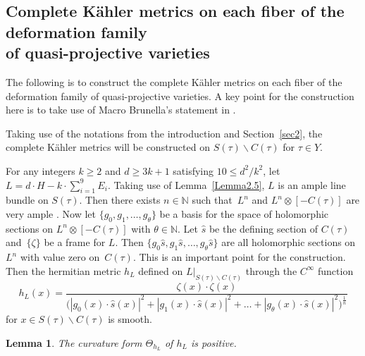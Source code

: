 \documentclass[10pt,a4paper]{amsart}
\numberwithin{equation}{section}
\newtheorem{Lemma}[Theorem]{Lemma}
\def\overline#1{#1}
\begin{document}
\subsection[Complete K\"ahler metrics on each fiber of the deformation family of quasi-projective varieties]{Complete K\"ahler metrics on each fiber of the deformation family\\ of quasi-projective varieties}

The following is to construct the complete K\"ahler metrics on each fiber of the deformation family of quasi-projective varieties. A key point for the construction here is to take use of Macro Brunella's statement in \cite{Marco}.

Taking use of the notations from the introduction and Section~\ref{sec2}, the complete K\"ahler metrics will be constructed on $S(\tau)\backslash C(\tau)$ for $\tau \in Y$.

For any integers $k\geq 2$ and $d \geq 3k+1$ satisfying $10 \leq d^2/k^2$, let $L=d\cdot H-k\cdot\sum _{i=1}^9 E_i$. Taking use of Lemma~\ref{Lemma2.5}, $L$ is an ample line bundle on $S(\tau)$. Then there exists $n\in \mathbb{N}$ such that~$L^n$ and $L^n\otimes [-C(\tau)]$ are very ample \cite{Phillip}. Now let $ \{ g_0,g_1,\dots ,g_{\theta} \}$ be a basis for the space of holomorphic sections on $L^n\otimes [-C(\tau)]$ with $\theta \in \mathbb{N}$. Let $\hat{s}$ be the defining section of $C(\tau)$ and~$ \{ \zeta \}$ be a frame for $L$. Then $ \{ g_0\hat{s},g_1\hat{s},\dots ,g_{\theta} \hat{s} \}$ are all holomorphic sections on $L^n$ with value zero on~$C(\tau)$. This is an important point for the construction. Then the hermitian metric $h_L$ defined on $L|_{S(\tau)\backslash C(\tau)}$ through the $C^\infty $ function
\[
h_L(x)=\frac{\zeta(x) \cdot \overline{\zeta (x)}}{\bigl(|g_0(x)\cdot \hat{s}(x)|^2+|g_1(x)\cdot \hat{s}(x)|^2+\dots +|g_{\theta}(x)\cdot \hat{s}(x)|^2\bigr)^{\frac{1}{n}}}
\]
for $x \in S(\tau)\backslash C(\tau)$ is smooth.

\begin{Lemma} \label{Lemma3.16}
The curvature form $\Theta_{h_L}$ of $h_L$ is positive.
\end{Lemma}
\end{document}
